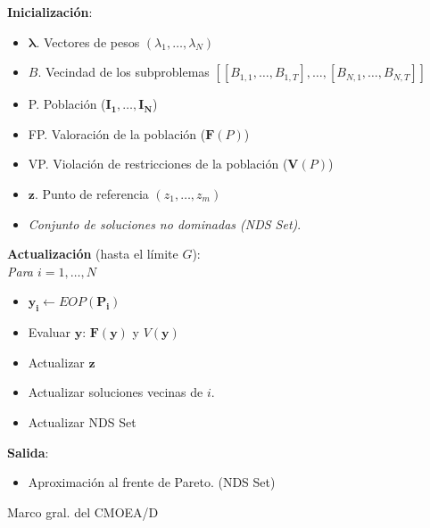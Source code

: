 \begin{minipage}[H]{0.47\linewidth}
\begin{algorithm}[H]
 \textbf{Inicialización}:
    \begin{itemize}
        \vspace{0.15cm}\item $\boldsymbol{\lambda}$. Vectores de pesos $(\lambda_1, \dots, \lambda_N)$
        \vspace{0.15cm}\item $B$. Vecindad de los subproblemas $[[B_{1,1}, \dots, B_{1,T}], \dots, [B_{N,1}, \dots, B_{N,T}] ]$
        \vspace{0.15cm}\item P. Población ($\boldsymbol{I_1}, \dots, \boldsymbol{I_N}$)
        \vspace{0.15cm}\item FP. Valoración de la población ($\boldsymbol{F}(P)$)
        \vspace{0.15cm}\item VP. Violación de restricciones de la población ($\boldsymbol{V}(P)$)
        \vspace{0.15cm}\item $\boldsymbol{z}$. Punto de referencia $(z_1, \dots, z_m)$
        \vspace{0.15cm}\item \textit{Conjunto de soluciones no dominadas (NDS Set)}. 
    \end{itemize}
    
\vspace{0.3cm}
  
 \textbf{Actualización} (hasta el límite $G$):\\
    \textit{Para $i=1, \dots, N$}
        \begin{itemize}
            \vspace{0.15cm}\item $\boldsymbol{y_i} \gets EOP(\boldsymbol{P_i})$
            
            \vspace{0.15cm}\item Evaluar $\boldsymbol{y}$: $\boldsymbol{F}(\boldsymbol{y})$ y $V(\boldsymbol{y})$
            \vspace{0.15cm}\item Actualizar $\boldsymbol{z}$
            \vspace{0.15cm}\item Actualizar soluciones vecinas de $i$.
            \vspace{0.15cm}\item Actualizar NDS Set
        \end{itemize}
    
     
    \vspace{0.3cm} 
    
    \textbf{Salida}:
    \begin{itemize}
        \item Aproximación al frente de Pareto. (NDS Set)
    \end{itemize}
 \caption{Marco gral. del CMOEA/D}
 \label{alg:1}
\end{algorithm}
\end{minipage}\\



